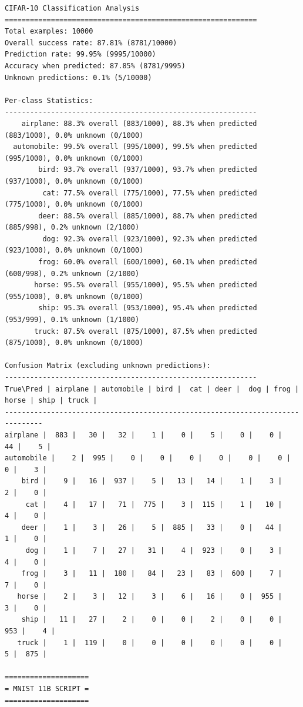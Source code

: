 \begin{verbatim}
CIFAR-10 Classification Analysis
============================================================
Total examples: 10000
Overall success rate: 87.81% (8781/10000)
Prediction rate: 99.95% (9995/10000)
Accuracy when predicted: 87.85% (8781/9995)
Unknown predictions: 0.1% (5/10000)

Per-class Statistics:
------------------------------------------------------------
    airplane: 88.3% overall (883/1000), 88.3% when predicted (883/1000), 0.0% unknown (0/1000)
  automobile: 99.5% overall (995/1000), 99.5% when predicted (995/1000), 0.0% unknown (0/1000)
        bird: 93.7% overall (937/1000), 93.7% when predicted (937/1000), 0.0% unknown (0/1000)
         cat: 77.5% overall (775/1000), 77.5% when predicted (775/1000), 0.0% unknown (0/1000)
        deer: 88.5% overall (885/1000), 88.7% when predicted (885/998), 0.2% unknown (2/1000)
         dog: 92.3% overall (923/1000), 92.3% when predicted (923/1000), 0.0% unknown (0/1000)
        frog: 60.0% overall (600/1000), 60.1% when predicted (600/998), 0.2% unknown (2/1000)
       horse: 95.5% overall (955/1000), 95.5% when predicted (955/1000), 0.0% unknown (0/1000)
        ship: 95.3% overall (953/1000), 95.4% when predicted (953/999), 0.1% unknown (1/1000)
       truck: 87.5% overall (875/1000), 87.5% when predicted (875/1000), 0.0% unknown (0/1000)

Confusion Matrix (excluding unknown predictions):
------------------------------------------------------------
True\Pred | airplane | automobile | bird |  cat | deer |  dog | frog | horse | ship | truck |
-------------------------------------------------------------------------------
airplane |  883 |   30 |   32 |    1 |    0 |    5 |    0 |    0 |   44 |    5 |
automobile |    2 |  995 |    0 |    0 |    0 |    0 |    0 |    0 |    0 |    3 |
    bird |    9 |   16 |  937 |    5 |   13 |   14 |    1 |    3 |    2 |    0 |
     cat |    4 |   17 |   71 |  775 |    3 |  115 |    1 |   10 |    4 |    0 |
    deer |    1 |    3 |   26 |    5 |  885 |   33 |    0 |   44 |    1 |    0 |
     dog |    1 |    7 |   27 |   31 |    4 |  923 |    0 |    3 |    4 |    0 |
    frog |    3 |   11 |  180 |   84 |   23 |   83 |  600 |    7 |    7 |    0 |
   horse |    2 |    3 |   12 |    3 |    6 |   16 |    0 |  955 |    3 |    0 |
    ship |   11 |   27 |    2 |    0 |    0 |    2 |    0 |    0 |  953 |    4 |
   truck |    1 |  119 |    0 |    0 |    0 |    0 |    0 |    0 |    5 |  875 |

====================
= MNIST 11B SCRIPT =
====================


\end{verbatim}
